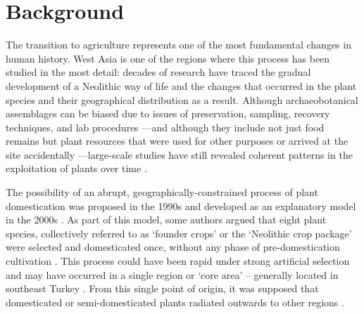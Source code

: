 \documentclass[
  authoryear,
  preprint]{elsarticle}
\begin{document}
\section{Background}\label{sec-bg}

The transition to agriculture represents one of the most fundamental
changes in human history. West Asia is one of the regions where this
process has been studied in the most detail: decades of research have
traced the gradual development of a Neolithic way of life and the
changes that occurred in the plant species and their geographical
distribution as a result. Although archaeobotanical assemblages can be
biased due to issues of preservation, sampling, recovery techniques, and
lab procedures \citep{Dennel1976, HastorfPopper1988}---and although they
include not just food remains but plant resources that were used for
other purposes or arrived at the site accidentally
\citep{HastorfPopper1988}---large-scale studies have still revealed
coherent patterns in the exploitation of plants over time
\citep{ColledgeEtAl2004, ArranzOtaeguiEtAl2016}.

The possibility of an abrupt, geographically-constrained process of
plant domestication was proposed in the 1990s
\citep{HillmanDavies1990, HillmanDavies1992, HeunEtAl1997, OzkanEtAl2002}
and developed as an explanatory model in the 2000s
\citep{LevYadunEtAl2000, GopherEtAl2001, AbboEtAl2005}. As part of this
model, some authors
\citep{LevYadunEtAl2000, GopherEtAl2001, AbboEtAl2010, AbboEtAl2012}
argued that eight plant species, collectively referred to as `founder
crops' or the `Neolithic crop package' \citep{ZoharyHopf1988} were
selected and domesticated once, without any phase of pre-domestication
cultivation \citep[p.~177]{AbboEtAl2011}. This process could have been
rapid under strong artificial selection
\citep{HillmanDavies1990, HillmanDavies1992} and may have occurred in a
single region or `core area' -- generally located in southeast Turkey
\citep{LadizinskyAdler1976, HeunEtAl1997, OzkanEtAl2002, OzkanEtAl2005, MoriEtAl2003, LuoEtAl2007}.
From this single point of origin, it was supposed that domesticated or
semi-domesticated plants radiated outwards to other regions
\citep{AbboEtAl2006, KilianEtAl2007, OzkanEtAl2011}.
\end{document}
